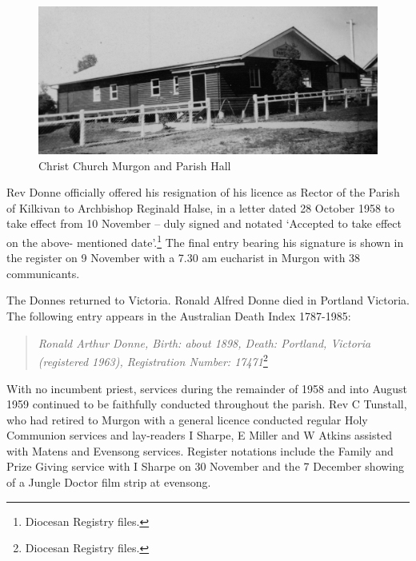 \begin{figure}[!htb]
\begin{center}
\includegraphics[width=1.\textwidth,center]{../images/churchHallEarly.jpg}
\caption{Christ Church Murgon and Parish Hall}
\end{center}
\end{figure}




Rev Donne officially offered his resignation of his licence as Rector of the Parish of Kilkivan to Archbishop Reginald Halse, in a letter dated 28 October 1958 to take effect from 10 November -- duly signed and notated `Accepted to take effect on the above- mentioned date'.\footnote{Diocesan Registry files.} The final entry bearing his signature is shown in the register on 9 November with a 7.30 am eucharist in Murgon with 38 communicants.


The Donnes returned to Victoria. Ronald Alfred Donne died in Portland Victoria. The following entry appears in the Australian Death Index 1787-1985:



\begin{quote}

\emph{Ronald Arthur Donne, Birth: about 1898, Death: Portland, Victoria (registered 1963), Registration Number: 17471}\footnote{Diocesan Registry files.}
\end{quote}



With no incumbent priest, services during the remainder of 1958 and into August 1959 continued to be faithfully conducted throughout the parish. Rev C Tunstall, who had retired to Murgon with a general licence conducted regular Holy Communion services and lay-readers I Sharpe, E Miller and W Atkins assisted with Matens and Evensong services. Register notations include the Family and Prize Giving service with I Sharpe on 30 November and the 7 December showing of a Jungle Doctor film strip at evensong.



